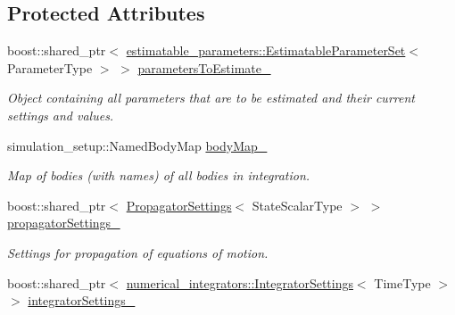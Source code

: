 \subsection*{Protected Attributes}
\begin{DoxyCompactItemize}
\item 
boost\+::shared\+\_\+ptr$<$ \hyperlink{classtudat_1_1estimatable__parameters_1_1EstimatableParameterSet}{estimatable\+\_\+parameters\+::\+Estimatable\+Parameter\+Set}$<$ Parameter\+Type $>$ $>$ \hyperlink{classtudat_1_1propagators_1_1VariationalEquationsSolver_a6817642d5b3777aefb2afa6aa4a837c7}{parameters\+To\+Estimate\+\_\+}\hypertarget{classtudat_1_1propagators_1_1VariationalEquationsSolver_a6817642d5b3777aefb2afa6aa4a837c7}{}\label{classtudat_1_1propagators_1_1VariationalEquationsSolver_a6817642d5b3777aefb2afa6aa4a837c7}

\begin{DoxyCompactList}\small\item\em Object containing all parameters that are to be estimated and their current settings and values. \end{DoxyCompactList}\item 
simulation\+\_\+setup\+::\+Named\+Body\+Map \hyperlink{classtudat_1_1propagators_1_1VariationalEquationsSolver_a40b4be0225f2330905ab9f1682949a01}{body\+Map\+\_\+}\hypertarget{classtudat_1_1propagators_1_1VariationalEquationsSolver_a40b4be0225f2330905ab9f1682949a01}{}\label{classtudat_1_1propagators_1_1VariationalEquationsSolver_a40b4be0225f2330905ab9f1682949a01}

\begin{DoxyCompactList}\small\item\em Map of bodies (with names) of all bodies in integration. \end{DoxyCompactList}\item 
boost\+::shared\+\_\+ptr$<$ \hyperlink{classtudat_1_1propagators_1_1PropagatorSettings}{Propagator\+Settings}$<$ State\+Scalar\+Type $>$ $>$ \hyperlink{classtudat_1_1propagators_1_1VariationalEquationsSolver_a05efc1aa102c904f9fd067c42d0f0147}{propagator\+Settings\+\_\+}\hypertarget{classtudat_1_1propagators_1_1VariationalEquationsSolver_a05efc1aa102c904f9fd067c42d0f0147}{}\label{classtudat_1_1propagators_1_1VariationalEquationsSolver_a05efc1aa102c904f9fd067c42d0f0147}

\begin{DoxyCompactList}\small\item\em Settings for propagation of equations of motion. \end{DoxyCompactList}\item 
boost\+::shared\+\_\+ptr$<$ \hyperlink{classtudat_1_1numerical__integrators_1_1IntegratorSettings}{numerical\+\_\+integrators\+::\+Integrator\+Settings}$<$ Time\+Type $>$ $>$ \hyperlink{classtudat_1_1propagators_1_1VariationalEquationsSolver_a6dcce7f553899e40a95ee33ceb7535d8}{integrator\+Settings\+\_\+}\hypertarget{classtudat_1_1propagators_1_1VariationalEquationsSolver_a6dcce7f553899e40a95ee33ceb7535d8}{}\label{classtudat_1_1propagators_1_1VariationalEquationsSolver_a6dcce7f553899e40a95ee33ceb7535d8}


\end{DoxyCompactItemize}
